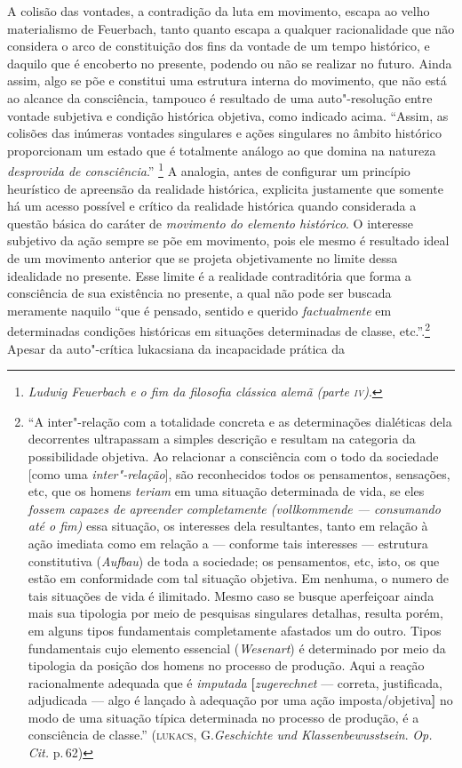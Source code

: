 A colisão das vontades, a contradição da luta em movimento, escapa ao
velho materialismo de Feuerbach, tanto quanto escapa a qualquer
racionalidade que não considera o arco de constituição dos fins da
vontade de um tempo histórico, e daquilo que é encoberto no presente,
podendo ou não se realizar no futuro. Ainda assim, algo se põe e
constitui uma estrutura interna do movimento, que não está ao alcance da
consciência, tampouco é resultado de uma auto"-resolução entre vontade
subjetiva e condição histórica objetiva, como indicado acima. ``Assim,
as colisões das inúmeras vontades singulares e ações singulares no
âmbito histórico proporcionam um estado que é totalmente análogo ao que
domina na natureza \emph{desprovida de consciência}.'' \footnote{\emph{Ludwig
  Feuerbach e o fim da filosofia clássica alemã (parte \textsc{iv})}.} A
analogia, antes de configurar um princípio heurístico de apreensão da
realidade histórica, explicita justamente que somente há um acesso
possível e crítico da realidade histórica quando considerada a questão
básica do caráter de \emph{movimento do elemento histórico}. O interesse
subjetivo da ação sempre se põe em movimento, pois ele mesmo é resultado
ideal de um movimento anterior que se projeta objetivamente no limite
dessa idealidade no presente. Esse limite é a realidade contraditória
que forma a consciência de sua existência no presente, a qual não pode
ser buscada meramente naquilo ``que é pensado, sentido e querido
\emph{factualmente} em determinadas condições históricas em situações
determinadas de classe, etc.''.\footnote{``A inter"-relação com a
  totalidade concreta e as determinações dialéticas dela decorrentes
  ultrapassam a simples descrição e resultam na categoria da
  possibilidade objetiva. Ao relacionar a consciência com o todo da
  sociedade {[}como uma \emph{inter"-relação}{]}, são reconhecidos todos
  os pensamentos, sensações, etc, que os homens \emph{teriam} em uma
  situação determinada de vida, se eles \emph{fossem capazes de
  apreender completamente (vollkommende --- consumando até o fim)} essa
  situação, os interesses dela resultantes, tanto em relação à ação
  imediata como em relação a --- conforme tais interesses --- estrutura
  constitutiva (\emph{Aufbau}) de toda a sociedade; os pensamentos, etc,
  isto, os que estão em conformidade com tal situação objetiva. Em
  nenhuma, o numero de tais situações de vida é ilimitado. Mesmo caso se
  busque aperfeiçoar ainda mais sua tipologia por meio de pesquisas
  singulares detalhas, resulta porém, em alguns tipos fundamentais
  completamente afastados um do outro. Tipos fundamentais cujo elemento
  essencial (\emph{Wesenart}) é determinado por meio da tipologia da
  posição dos homens no processo de produção. Aqui a reação
  racionalmente adequada que é \emph{imputada}
  \textbf{{[}}\emph{zugerechnet} --- correta, justificada,
  adjudicada --- algo é lançado à adequação por uma ação
  imposta/objetiva\textbf{{]}} no modo de uma situação típica
  determinada no processo de produção, é a consciência de classe.''
  (\textsc{lukacs}, G.\emph{Geschichte und Klassenbewusstsein}. \emph{Op.\,Cit.}
  p.\,62)} Apesar da auto"-crítica lukacsiana da incapacidade prática da
